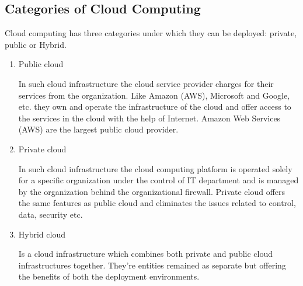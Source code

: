 \subsection{Categories of Cloud Computing}
Cloud computing has three categories under which they can be deployed: private, public or Hybrid.
\par
\begin{enumerate}

\item Public cloud  
\par
In such cloud infrastructure the cloud service provider charges for their services from the organization. Like Amazon (AWS), Microsoft and Google, etc. they own and operate the infrastructure of the cloud and offer access to the services in the cloud with the help of Internet. Amazon Web Services (AWS) are the largest public cloud provider.

\item Private cloud
\par
In such cloud infrastructure the cloud computing platform is operated solely for a specific organization under the control of IT department and is managed by the organization behind the organizational firewall. Private cloud offers the same features as public cloud and eliminates the issues related to control, data, security etc.


\item Hybrid cloud
\par
Is a cloud infrastructure which combines both private and public cloud infrastructures together. They're entities remained as separate but offering the benefits of both the deployment environments.
\end{enumerate}

